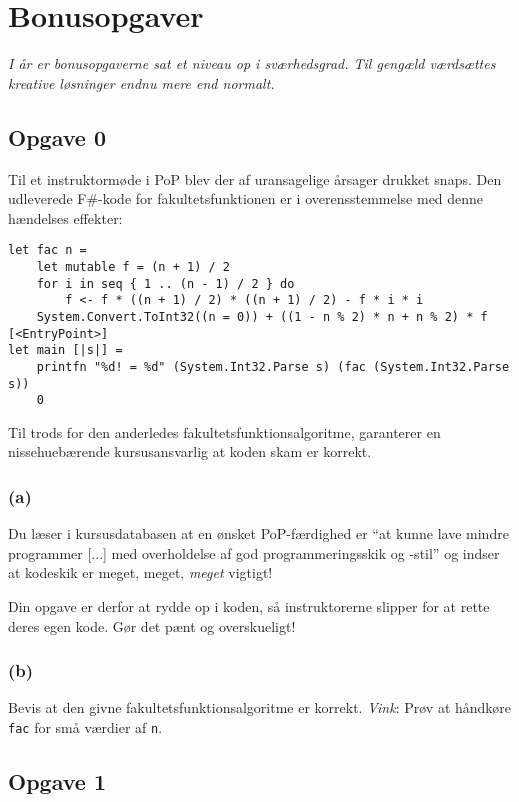 \section{\huge{Bonusopgaver}}

\emph{I år er bonusopgaverne sat et niveau op i sværhedsgrad.  Til gengæld
  værdsættes kreative løsninger endnu mere end normalt.}

\subsection{Opgave 0}

Til et instruktormøde i PoP blev der af uransagelige årsager drukket snaps.  Den
udleverede F\#-kode for fakultetsfunktionen er i overensstemmelse med denne
hændelses effekter:

\tiny
\begin{verbatim}
let fac n =
    let mutable f = (n + 1) / 2
    for i in seq { 1 .. (n - 1) / 2 } do
        f <- f * ((n + 1) / 2) * ((n + 1) / 2) - f * i * i
    System.Convert.ToInt32((n = 0)) + ((1 - n % 2) * n + n % 2) * f
[<EntryPoint>]
let main [|s|] =
    printfn "%d! = %d" (System.Int32.Parse s) (fac (System.Int32.Parse s))
    0
\end{verbatim}
\normalsize

Til trods for den anderledes fakultetsfunktionsalgoritme, garanterer en
nissehuebærende kursusansvarlig at koden skam er korrekt.

\subsubsection{(a)}

Du læser i kursusdatabasen at en ønsket PoP-færdighed er ``at kunne lave mindre
programmer [...] med overholdelse af god programmeringsskik og -stil'' og indser
at kodeskik er meget, meget, \emph{meget} vigtigt!

Din opgave er derfor at rydde op i koden, så instruktorerne slipper for at rette
deres egen kode.  Gør det pænt og overskueligt!


\subsubsection{(b)}

Bevis at den givne fakultetsfunktionsalgoritme er korrekt.  \emph{Vink}: Prøv at
håndkøre \texttt{fac} for små værdier af \texttt{n}.


\newpage
\subsection{Opgave 1}

